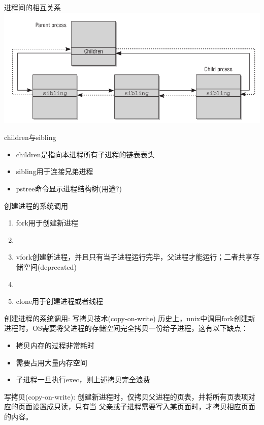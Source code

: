 \documentclass[xcolor=svgnames]{beamer}
\begin{document}
\begin{CJK*}{UTF8}{gbsn}
\begin{frame}{进程间的相互关系}
\includegraphics[width=1.0\textwidth]{parent.png}
\begin{block}{children与sibling}
\begin{itemize}
\item children是指向本进程所有子进程的链表表头
\item sibling用于连接兄弟进程
\item pstree命令显示进程结构树(用途?)
\end{itemize}
\end{block}
\end{frame}

\begin{frame}{创建进程的系统调用}
\begin{enumerate}
\item fork用于创建新进程
\item[]
\item vfork创建新进程，并且只有当子进程运行完毕，父进程才能运行；二者共享存储空间(deprecated)
\item[]
\item clone用于创建进程或者线程

\end{enumerate}
\end{frame}

\begin{frame}{创建进程的系统调用: 写拷贝技术(copy-on-write)}
历史上，unix中调用fork创建新进程时，OS需要将父进程的存储空间完全拷贝一份给子进程，这有以下缺点：
\begin{itemize}
\item 拷贝内存的过程非常耗时
\item 需要占用大量内存空间
\item 子进程一旦执行exec，则上述拷贝完全浪费
\end{itemize}

写拷贝(copy-on-write): 创建新进程时，仅拷贝父进程的页表，并将所有页表项对应的页面设置成只读，只有当
父亲或子进程需要写入某页面时，才拷贝相应页面的内容。
\end{frame}


\end{CJK*}
\end{document}
